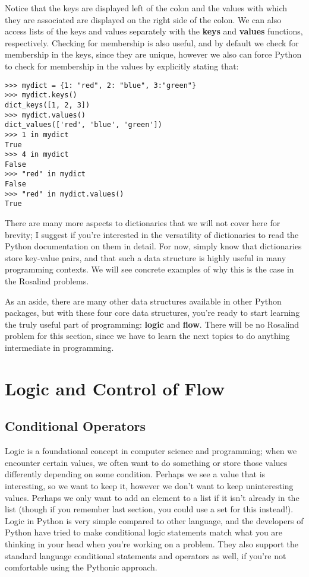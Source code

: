 \documentclass[a4paper,11pt]{article}
\begin{document}
Notice that the keys are displayed left of the colon and the values with which they are associated are 
displayed on the right side of the colon.  We can also access lists of the keys and values separately 
with the \textbf{keys} and \textbf{values} functions, respectively.  Checking for membership is also 
useful, and by default we check for membership in the keys, since they are unique, however we also
can force Python to check for membership in the values by explicitly stating that:

\vspace{3mm}
\begin{lstlisting}
>>> mydict = {1: "red", 2: "blue", 3:"green"}
>>> mydict.keys()
dict_keys([1, 2, 3])
>>> mydict.values()
dict_values(['red', 'blue', 'green'])
>>> 1 in mydict
True
>>> 4 in mydict
False
>>> "red" in mydict
False
>>> "red" in mydict.values()
True
\end{lstlisting}
\vspace{3mm}

There are many more aspects to dictionaries that we will not cover here for brevity; I suggest if you're 
interested in the versatility of dictionaries to read the Python documentation on them in detail.  For now, 
simply know that dictionaries store key-value pairs, and that such a data structure is highly useful in 
many programming contexts.  We will see concrete examples of why this is the case in the Rosalind problems. \par

As an aside, there are many other data structures available in other Python packages, but with these four 
core data structures, you're ready to start learning the truly useful part of programming: \textbf{logic} and 
\textbf{flow}.  There will be no Rosalind problem for this section, since we have to learn the next topics 
to do anything intermediate in programming.


\pagebreak
\section{Logic and Control of Flow}
\subsection{Conditional Operators}
Logic is a foundational concept in computer science and programming; when we encounter certain values, 
we often want to do something or store those values differently depending on some condition.  Perhaps 
we see a value that is interesting, so we want to keep it, however we don't want to keep uninteresting 
values.  Perhaps we only want to add an element to a list if it isn't already in the list (though 
if you remember last section, you could use a set for this instead!).  Logic in Python is very 
simple compared to other language, and the developers of Python have tried to make conditional logic 
statements match what you are thinking in your head when you're working on a problem.  They also 
support the standard language conditional statements and operators as well, if you're not comfortable 
using the Pythonic approach.  \par
\end{document}
